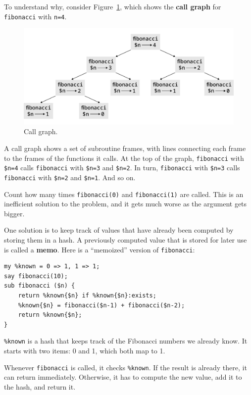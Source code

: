 To understand why, consider Figure~\ref{fig.fibonacci}, which shows
the {\bf call graph} for {\tt fibonacci} with {\tt n=4}.

\begin{figure}
\centerline
{\includegraphics[scale=0.7]{figs/fibonacci.pdf}}
\caption{Call graph.}
\label{fig.fibonacci}
\end{figure}

A call graph shows a set of subroutine frames, with lines 
connecting each frame to the frames of the functions it 
calls.  At the top of the graph, {\tt fibonacci} with 
\verb'$n=4' calls {\tt fibonacci} with \verb'$n=3' and 
\verb'$n=2'.  In turn, {\tt fibonacci} with \verb'$n=3' calls
{\tt fibonacci} with \verb'$n=2' and \verb'$n=1'.  And so on.

Count how many times {\tt fibonacci(0)} and {\tt fibonacci(1)} 
are called.  This is an inefficient solution to the problem, 
and it gets much worse as the argument gets bigger.

One solution is to keep track of values that have already been
computed by storing them in a hash.  A previously computed value
that is stored for later use is called a {\bf memo}.  Here is a
``memoized'' version of {\tt fibonacci}:

\begin{verbatim}
my %known = 0 => 1, 1 => 1;
say fibonacci(10);
sub fibonacci ($n) {
    return %known{$n} if %known{$n}:exists;
    %known{$n} = fibonacci($n-1) + fibonacci($n-2);
    return %known{$n};
}
\end{verbatim}
%

\verb'%known' is a hash that keeps track of the Fibonacci
numbers we already know.  It starts with
two items: 0 and 1, which both map to 1.

Whenever {\tt fibonacci} is called, it checks \verb'%known'.
If the result is already there, it can return
immediately.  Otherwise, it has to 
compute the new value, add it to the hash, and return it.

